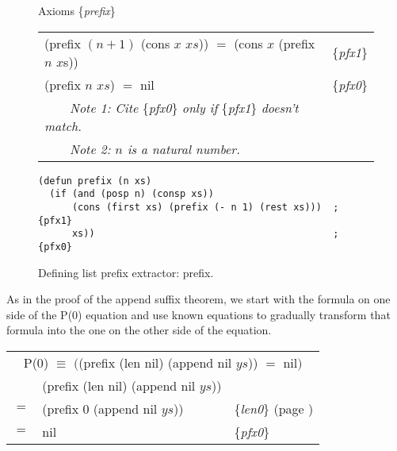 \begin{figure}
\begin{center}
Axioms \{\emph{prefix}\}                                           \\
\begin{tabular}{ll}
\hline
\textsf{(prefix $(n + 1)$ (cons $x$ $xs$))} $=$ \textsf{(cons $x$ (prefix $n$ $x$s))} & \{\emph{pfx1}\} \\
\textsf{(prefix $n$ $xs$)} $=$  \textsf{nil}                                          & \{\emph{pfx0}\} \\
~~~~\emph{Note 1: Cite }\{\emph{pfx0}\} \emph{only if} \{\emph{pfx1}\} \emph{doesn't match.}&\\
~~~~\emph{Note 2: $n$ is a natural number.}
\end{tabular}
\begin{code}
\begin{verbatim}
(defun prefix (n xs)
  (if (and (posp n) (consp xs))
      (cons (first xs) (prefix (- n 1) (rest xs)))  ; {pfx1}
      xs))                                          ; {pfx0}
\end{verbatim}
\end{code}
\end{center}
\caption{Defining list prefix extractor: \textsf{prefix}.}
\label{prefix-equations}
\end{figure}

As in the proof of the append suffix theorem, we start
with the formula on one side of the P(0) equation
and use known equations to gradually transform
that formula into the one on the other side of the equation.
\begin{center}
\begin{tabular}{lll}
\multicolumn{3}{c}{P($0$) $\equiv$ $($\textsf{(prefix (len nil) (append nil $ys$))} $=$ \textsf{nil}$)$}\\
    & \textsf{(prefix (len nil) (append nil $ys$))}  &                                                  \\
$=$ & \textsf{(prefix 0 (append nil $ys$))}          & \{\emph{len0}\} (page \pageref{len-equations})   \\
$=$ & \textsf{nil}                                   & \{\emph{pfx0}\}                                  \\
\end{tabular}
\end{center}

